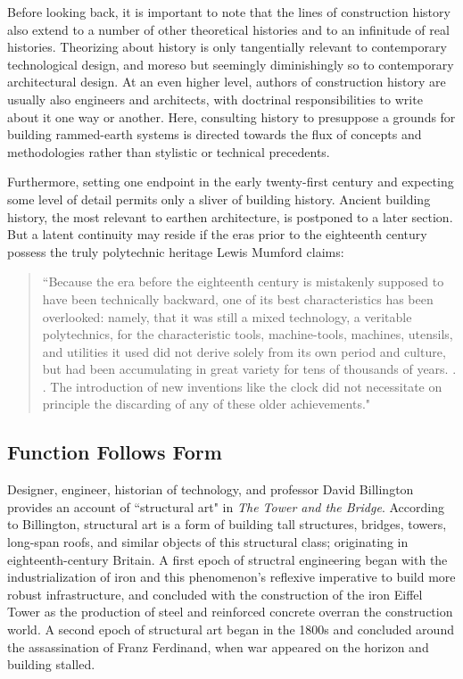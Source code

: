 \clearpage

Before looking back, it is important to note that the lines of construction history also extend to a number of other theoretical histories and to an infinitude of real histories. Theorizing about history is only tangentially relevant to contemporary technological design, and moreso but seemingly diminishingly so to contemporary architectural design. At an even higher level, authors of construction history are usually also engineers and architects, with doctrinal responsibilities to write about it one way or another. \cite[p14]{CONSHISTORY} Here, consulting history to presuppose a grounds for building rammed-earth systems is directed towards the flux of concepts and methodologies rather than stylistic or technical precedents.

Furthermore, setting one endpoint in the early twenty-first century and expecting some level of detail permits only a sliver of building history. Ancient building history, the most relevant to earthen architecture, is postponed to a later section. But a latent continuity may reside if the eras prior to the eighteenth century possess the truly polytechnic heritage Lewis Mumford claims:

\begin{quote}
\small{
``Because the era before the eighteenth century is mistakenly supposed to have been technically backward, one of its best characteristics has been overlooked: namely, that it was still a mixed technology, a veritable polytechnics, for the characteristic tools, machine-tools, machines, utensils, and utilities it used did not derive solely from its own period and culture, but had been accumulating in great variety for tens of thousands of years. . . The introduction of new inventions like the clock did not necessitate on principle the discarding of any of these older achievements."} \cite[p134]{MYTHMACHINE}
\end{quote}

\subsection{Function Follows Form}

Designer, engineer, historian of technology, and professor David Billington provides an account of ``structural art" in \textit{The Tower and the Bridge}. According to Billington, structural art is a form of building tall structures, bridges, towers, long-span roofs, and similar objects of this structural class; originating in eighteenth-century Britain. A first epoch of structral engineering began with the industrialization of iron and this phenomenon's reflexive imperative to build more robust infrastructure, and concluded with the construction of the iron Eiffel Tower as the production of steel and reinforced concrete overran the construction world. A second epoch of structural art began in the 1800s and concluded around the assassination of Franz Ferdinand, when war appeared on the horizon and building stalled. \cite[p7]{TOWERANDBRIDGE}

